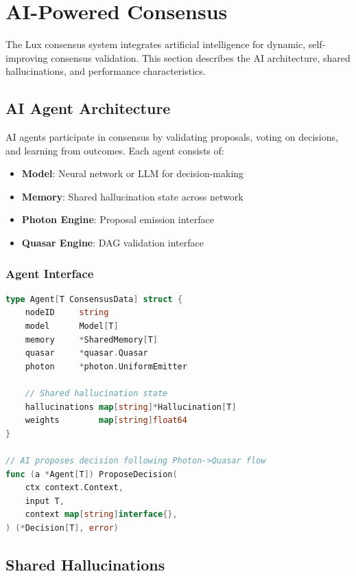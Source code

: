 \section{AI-Powered Consensus}

The Lux consensus system integrates artificial intelligence for dynamic, self-improving consensus validation. This section describes the AI architecture, shared hallucinations, and performance characteristics.

\subsection{AI Agent Architecture}

AI agents participate in consensus by validating proposals, voting on decisions, and learning from outcomes. Each agent consists of:

\begin{itemize}
\item \textbf{Model}: Neural network or LLM for decision-making
\item \textbf{Memory}: Shared hallucination state across network
\item \textbf{Photon Engine}: Proposal emission interface
\item \textbf{Quasar Engine}: DAG validation interface
\end{itemize}

\subsubsection{Agent Interface}

\begin{lstlisting}[language=Go]
type Agent[T ConsensusData] struct {
    nodeID     string
    model      Model[T]
    memory     *SharedMemory[T]
    quasar     *quasar.Quasar
    photon     *photon.UniformEmitter
    
    // Shared hallucination state
    hallucinations map[string]*Hallucination[T]
    weights        map[string]float64
}

// AI proposes decision following Photon->Quasar flow
func (a *Agent[T]) ProposeDecision(
    ctx context.Context,
    input T,
    context map[string]interface{},
) (*Decision[T], error)
\end{lstlisting}

\subsection{Shared Hallucinations}

